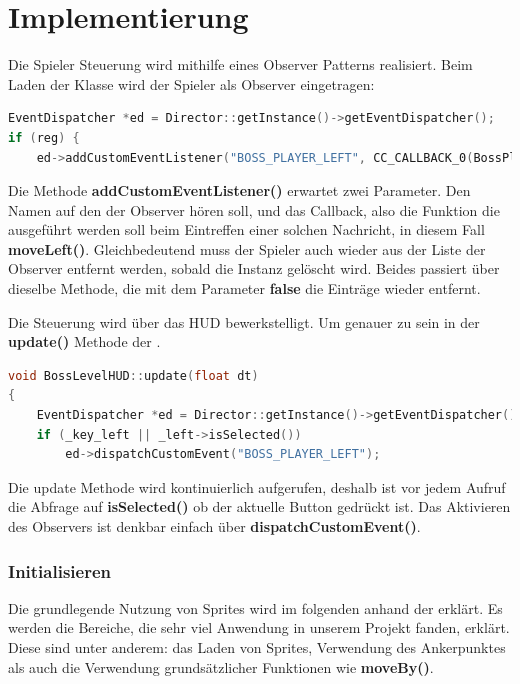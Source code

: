 \chapter{Implementierung}\label{ch:impl}

\label{sec:4_SpielerSteuerung}

Die Spieler Steuerung wird mithilfe eines Observer Patterns realisiert. Beim Laden der  Klasse wird der Spieler als Observer eingetragen:

\begin{lstlisting}[label=lst:player_control_observer,
				   language=C++,
				   firstnumber=103,
				   caption=BossPlayer als Observer eintragen ( BossPlayer.cpp )]
EventDispatcher *ed = Director::getInstance()->getEventDispatcher();
if (reg) {
	ed->addCustomEventListener("BOSS_PLAYER_LEFT", CC_CALLBACK_0(BossPlayer::moveLeft, this));
\end{lstlisting}

Die Methode \textbf{addCustomEventListener()} erwartet zwei Parameter. Den Namen auf den der Observer hören soll, und das Callback, also die Funktion die ausgeführt werden soll beim Eintreffen einer solchen Nachricht, in diesem Fall \textbf{moveLeft()}. 
Gleichbedeutend muss der Spieler auch wieder aus der Liste der Observer entfernt werden, sobald die Instanz gelöscht wird. Beides passiert über dieselbe Methode, die mit dem Parameter \textbf{false} die Einträge wieder entfernt.

Die Steuerung wird über das HUD bewerkstelligt. Um genauer zu sein in der \textbf{update()} Methode der .

\begin{lstlisting}[label=lst:player_control_push_msg,
				   language=C++,
				   firstnumber=181,
				   caption=Drücken des Laufen-Buttons ( BossLevelHUD.cpp )]
void BossLevelHUD::update(float dt)
{
	EventDispatcher *ed = Director::getInstance()->getEventDispatcher();
	if (_key_left || _left->isSelected())
		ed->dispatchCustomEvent("BOSS_PLAYER_LEFT");
\end{lstlisting}

Die update Methode wird kontinuierlich aufgerufen, deshalb ist vor jedem Aufruf die Abfrage auf \textbf{isSelected()} ob der aktuelle Button gedrückt ist. Das Aktivieren des Observers ist denkbar einfach über \textbf{dispatchCustomEvent()}.



\subsection{Initialisieren}
Die grundlegende Nutzung von Sprites wird im folgenden anhand der  erklärt. Es werden die Bereiche, die sehr viel Anwendung in unserem Projekt fanden, erklärt. Diese sind unter anderem: das Laden von Sprites, Verwendung des Ankerpunktes als auch die Verwendung grundsätzlicher Funktionen wie \textbf{moveBy()}.

